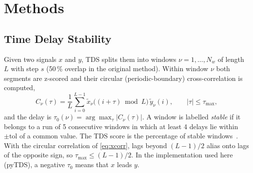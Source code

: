 \documentclass[11pt,a4paper]{article}
\begin{document}
\section{Methods}
\label{sec:method}
\subsection{Time Delay Stability}
\label{sec:tds}
Given two signals $x$ and $y$, TDS splits them into windows $\nu = 1, \dots, N_w$ of length $L$ with step $s$ (50\,\% overlap in the original method). Within window $\nu$ both segments are z-scored and their circular (periodic-boundary) cross-correlation is computed,
\begin{equation}
C_\nu(\tau) = \frac{1}{L} \sum_{i=0}^{L-1} \tilde{x}_\nu\big((i+\tau) \bmod L\big)\, \tilde{y}_\nu(i), \qquad |\tau| \le \tau_{\max} ,
\label{eq:xcorr}
\end{equation}
and the delay is $\tau_0(\nu) = \arg\max_\tau |C_\nu(\tau)|$. A window is labelled \emph{stable} if it belongs to a run of 5 consecutive windows in which at least 4 delays lie within $\pm\mathrm{tol}$ of a common value. The TDS score is the percentage of stable windows~\cite{Bashan2012NetworkPhysiology,Bartsch2015NetworkPhysiology}. With the circular correlation of \cref{eq:xcorr}, lags beyond $(L-1)/2$ alias onto lags of the opposite sign, so $\tau_{\max} \le (L-1)/2$. In the implementation used here (pyTDS), a negative $\tau_0$ means that $x$ leads $y$.
\end{document}
